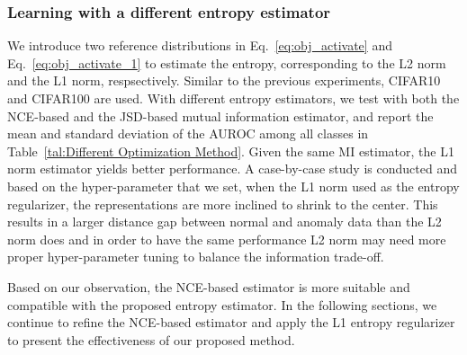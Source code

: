 \documentclass[journal]{IEEEtran}
\theoremstyle{remark}
\begin{document}
\subsubsection{\textbf{Learning with a different entropy estimator}}\label{sec:whichloss}

We introduce two reference distributions in Eq.~\ref{eq:obj_activate} and Eq.~\ref{eq:obj_activate_1} to estimate the entropy, corresponding to the L2 norm and the L1 norm, respsectively. Similar to the previous experiments, CIFAR10 and CIFAR100 are used. With different entropy estimators, we test with both the NCE-based and the JSD-based mutual information estimator, and report the mean and standard deviation of the AUROC among all classes in Table~\ref{tal:Different Optimization Method}. Given the same MI estimator, the L1 norm estimator yields better performance. A case-by-case study is conducted and based on the hyper-parameter that we set, when the L1 norm used as the entropy regularizer, the representations are more inclined to shrink to the center. This results in a larger distance gap between normal and anomaly data than the L2 norm does and in order to have the same performance L2 norm may need more proper hyper-parameter tuning to balance the information trade-off.

Based on our observation, the NCE-based estimator is more suitable and compatible with the proposed entropy estimator. In the following sections, we continue to refine the NCE-based estimator and apply the L1 entropy regularizer to present the effectiveness of our proposed method.
\end{document}
